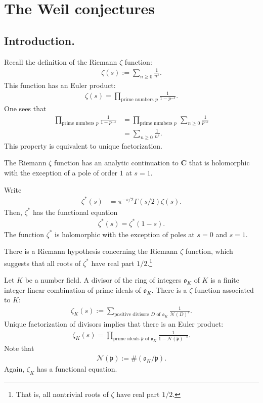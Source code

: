 \documentclass [11 pt, oneside] {article}
\begin{document}
\section{The Weil conjectures}
\subsection{Introduction.}
Recall the definition of the Riemann $\zeta$ function:
\begin{align*}
	\zeta(s) := \sum_{n\ge 0}^{} \frac{1}{n^s}.
\end{align*}
This function has an Euler product:
\begin{align*}
	\zeta(s) = \prod_{\textrm{prime numbers $p$}} \frac{1}{1-p^{-s}}.
\end{align*}
One sees that
\begin{align*}
	\prod_{\textrm{prime numbers $p$}} \frac{1}{1-p^{-s}} &= \prod_{\textrm{prime numbers $p$}} \,\sum_{n\ge 0}^{} \frac{1}{p^{ns}}\\
							     &= \sum_{n\ge 0}^{} \frac{1}{n^s}.
\end{align*}
This property is equivalent to unique factorization.

The Riemann $\zeta$ function has an analytic continuation to $\mathbf{C}$ that is holomorphic with the exception of a pole of order $1$ at $s=1$.

Write
\begin{align*}
	\zeta^*(s) &= \pi^{-s/2} \Gamma (s/2) \zeta (s).
\end{align*}
Then, $\zeta^*$ has the functional equation
\begin{align*}
	\zeta^*(s) = \zeta^* (1-s).
\end{align*}
The function $\zeta^*$ is holomorphic with the exception of poles at $s=0$ and $s=1$.

There is a Riemann hypothesis concerning the Riemann $\zeta$ function, which suggests that all roots of $\zeta^*$ have real part $1/2$.\footnote{That is, all nontrivial roots of $\zeta$ have real part $1/2$.}

Let $K$ be a number field. A divisor of the ring of integers $\mathfrak{o}_K$ of $K$ is a finite integer linear combination of prime ideals of $\mathfrak{o}_K$. 
There is a $\zeta$ function associated to $K$:
\begin{align*}
	\zeta_K(s) :=  \sum_{\textrm{positive divisors $D$ of $\mathfrak{o}_K$}}^{}\frac{1}{\mathscr{N}(D)^s}. 
\end{align*}
Unique factorization of divisors implies that there is an Euler product:
\begin{align*}
	\zeta_K(s) = \prod_{\textrm{prime ideals $\mathfrak{p}$ of $\mathfrak{o}_K$}} \frac{1}{1-\mathscr{N}( \mathfrak{p}) ^{-s}}.
\end{align*}
Note that
\begin{align*}
	\mathscr{N}(\mathfrak{p}) := \#(\mathfrak{o}_K/\mathfrak{p}).
\end{align*}
Again, $\zeta_K$ has a functional equation.
\end{document}
